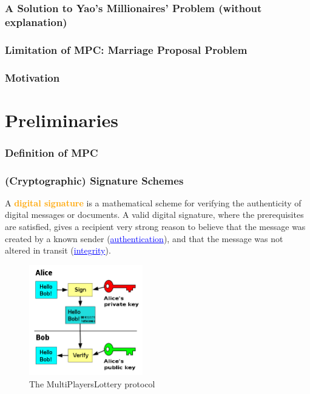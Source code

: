 \documentclass{beamer}
\begin{document}
\begin{frame}\frametitle{A Solution to Yao's Millionaires' Problem (without explanation)} 

\end{frame}


\begin{frame}\frametitle{Limitation of MPC: Marriage Proposal Problem} 

\end{frame}


\begin{frame}\frametitle{Motivation} 
\begin{center}
\end{center}


\end{frame}


\section{Preliminaries}

\begin{frame}\frametitle{Definition of MPC} 

\end{frame}


\begin{frame}\frametitle{(Cryptographic) Signature Schemes} 
A \textcolor{orange}{\textbf{digital signature}} is a mathematical scheme for verifying the authenticity of digital messages or documents. A valid digital signature, where the prerequisites are satisfied, gives a recipient very strong reason to believe that the message was created by a known sender (\textcolor{blue}{\underline{authentication}}), and that the message was not altered in transit (\textcolor{blue}{\underline{integrity}}).
\begin{figure}
	\includegraphics[width=2.6 in, height=1.9in]{myfigs/wikipedia-signature.jpg}
	\caption{The MultiPlayersLottery protocol}
\end{figure}
\end{frame}
\end{document}
